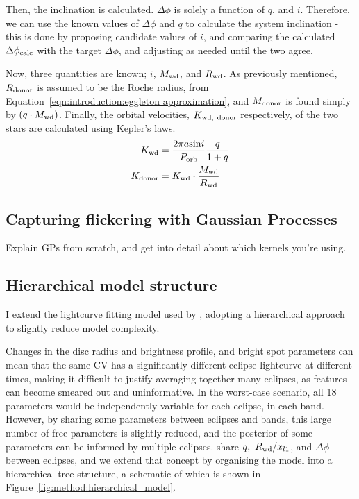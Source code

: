 Then, the inclination is calculated. $\Delta \phi$ is solely a function of $q$, and $i$. Therefore, we can use the known values of $\Delta\phi$ and $q$ to calculate the system inclination - this is done by proposing candidate values of $i$, and comparing the calculated $\Delta \phi_{\rm calc}$ with the target $\Delta \phi$, and adjusting as needed until the two agree.

Now, three quantities are known; $i$, $M_{\rm wd}$, and $R_{\rm wd}$. As previously mentioned, $R_{\rm donor}$ is assumed to be the Roche radius, from Equation~\ref{eqn:introduction:eggleton approximation}, and $M_{\rm donor}$ is found simply by $(q \cdot M_{\rm wd})$. Finally, the orbital velocities, $K_{\rm wd,\ donor}$ respectively, of the two stars are calculated using Kepler's laws.
\begin{align}
    K_{\rm wd} &= \frac{2\pi a \mathrm{sin}i}{P_{\rm orb}} \frac{q}{1+q} \\
    K_{\rm donor} &= K_{\rm wd} \cdot \frac{M_{\rm wd}}{R_{\rm wd}}
\end{align}


\subsection{Capturing flickering with Gaussian Processes}
Explain GPs from scratch, and get into detail about which kernels you're using.


\subsection{Hierarchical model structure}\label{sect:modelling:optimising eclipse model parameters}

I extend the lightcurve fitting model used by \citet{McAllister2019}, adopting a hierarchical approach to slightly reduce model complexity.

Changes in the disc radius and brightness profile, and bright spot parameters can mean that the same CV has a significantly different eclipse lightcurve at different times, making it difficult to justify averaging together many eclipses, as features can become smeared out and uninformative. In the worst-case scenario, all 18 parameters would be independently variable for each eclipse, in each band. However, by sharing some parameters between eclipses and bands, this large number of free parameters is slightly reduced, and the posterior of some parameters can be informed by multiple eclipses. \citet{McAllister2017} share $q,\ R_{\rm wd} / x_{l1}$, and $\Delta\phi$ between eclipses, and we extend that concept by organising the model into a hierarchical tree structure, a schematic of which is shown in Figure~\ref{fig:method:hierarchical_model}.

